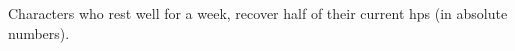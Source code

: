 %
Characters who rest well for a week, recover half of their current \glspl{hp} (in absolute numbers).
